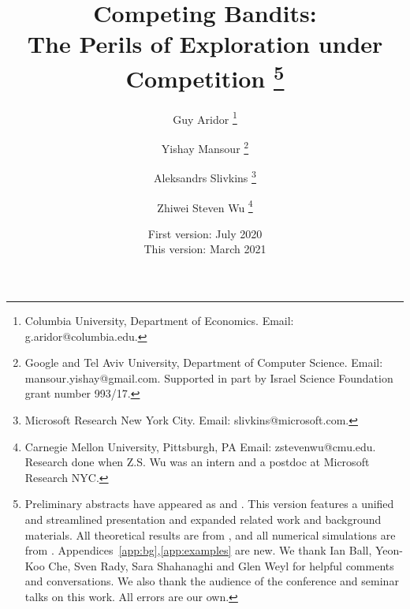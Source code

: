 \documentclass[12pt]{article}
\begin{document}

\title{\vspace{-12mm}Competing Bandits:\\
The Perils of Exploration under Competition%
\thanks{Preliminary abstracts have appeared as
\citet*{CompetingBandits-itcs18} and \citet*{CompetingBandits-ec19}.
This version features a unified and streamlined presentation and expanded related work and background materials. All theoretical results are from \citet{CompetingBandits-itcs18}, and all numerical simulations are from \citet{CompetingBandits-ec19}. Appendices~\ref{app:bg},\ref{app:examples} are new.
\newline \indent 
We thank Ian Ball, Yeon-Koo Che, Sven Rady, Sara Shahanaghi and Glen Weyl for helpful comments and conversations. We also thank the audience of the conference and seminar talks on this work.
All errors are our own.}}

\author{Guy Aridor
\footnote{Columbia University, Department of Economics. Email: g.aridor@columbia.edu.}
\and \hspace{-0.75cm}
\rule{0.0in}{0pt}
Yishay Mansour
\footnote{Google and Tel Aviv University, Department of Computer Science. Email: mansour.yishay@gmail.com.\newline
Supported in part by Israel Science Foundation grant number 993/17.}
\and \hspace{-0.75cm}
\rule{0.0in}{0pt}
Aleksandrs Slivkins
\footnote{Microsoft Research New York City. Email: slivkins@microsoft.com.}
\and \hspace{-0.75cm}
\rule{0.0in}{0pt}
Zhiwei Steven Wu%
\footnote{Carnegie Mellon University, Pittsburgh, PA
Email: zstevenwu@cmu.edu.\newline
Research done when Z.S. Wu was an intern and a postdoc at Microsoft Research NYC.}
}

\date{First version: July 2020\\ This version: March 2021}

\maketitle
\end{document}
